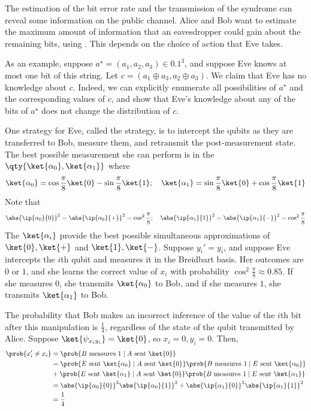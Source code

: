 The estimation of the bit error rate and the transmission of the syndrome can reveal some information on the public channel.
Alice and Bob want to estimate the maximum amount of information that an eavesdropper could gain about the remaining bits, using .
This depends on the choice of action that Eve takes.

As an example, suppose $a^\star = (a_1, a_2, a_3) \in \qty{0,1}^3$, and suppose Eve knows at most one bit of this string.
Let $c = (a_1 \oplus a_3, a_2 \oplus a_3)$.
We claim that Eve has no knowledge about $c$.
Indeed, we can explicitly enumerate all possibilities of $a^\star$ and the corresponding values of $c$, and show that Eve's knowledge about any of the bits of $a^\star$ does not change the distribution of $c$.

One strategy for Eve, called the  strategy, is to intercept the qubits as they are transferred to Bob, measure them, and retransmit the post-measurement state.
The best possible measurement she can perform is in the  $\qty{\ket{\alpha_0}, \ket{\alpha_1}}$ where
\[ \ket{\alpha_0} = \cos \frac{\pi}{8} \ket{0} - \sin \frac{\pi}{8} \ket{1};\quad \ket{\alpha_1} = \sin \frac{\pi}{8} \ket{0} + \cos \frac{\pi}{8} \ket{1} \]
Note that
\[ \abs{\ip{\alpha_0}{0}}^2 = \abs{\ip{\alpha_0}{+}}^2 = \cos^2 \frac{\pi}{8};\quad \abs{\ip{\alpha_1}{1}}^2 = \abs{\ip{\alpha_1}{-}}^2 = \cos^2 \frac{\pi}{8} \]
The $\ket{\alpha_i}$ provide the best possible simultaneous approximations of $\ket{0}, \ket{+}$ and $\ket{1}, \ket{-}$.
Suppose $y_i' = y_i$, and suppose Eve intercepts the $i$th qubit and measures it in the Breidbart basis.
Her outcomes are $0$ or $1$, and she learns the correct value of $x_i$ with probability $\cos^2 \frac{\pi}{8} \approx 0.85$.
If she measures $0$, she transmits $\ket{\alpha_0}$ to Bob, and if she measures $1$, she transmits $\ket{\alpha_1}$ to Bob.

The probability that Bob makes an incorrect inference of the value of the $i$th bit after this manipulation is $\frac{1}{4}$, regardless of the state of the qubit transmitted by Alice.
Suppose $\ket{\psi_{x_i y_i}} = \ket{0}$, so $x_i = 0, y_i = 0$.
Then,
\begin{align*}
    \prob{x_i' \neq x_i} &= \prob{B \text{ measures } 1 \mid A \text{ sent } \ket{0}} \\
    &= \prob{E \text{ sent } \ket{\alpha_0} \mid A \text{ sent } \ket{0}} \prob{B \text{ measures } 1 \mid E \text{ sent } \ket{\alpha_0}} \\
    &+ \prob{E \text{ sent } \ket{\alpha_1} \mid A \text{ sent } \ket{0}} \prob{B \text{ measures } 1 \mid E \text{ sent } \ket{\alpha_1}} \\
    &= \abs{\ip{\alpha_0}{0}}^2 \abs{\ip{\alpha_0}{1}}^2 + \abs{\ip{\alpha_1}{0}}^2 \abs{\ip{\alpha_1}{1}}^2 \\
    &= \frac{1}{4}
\end{align*}
